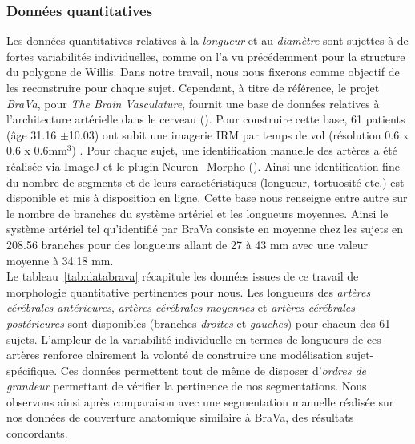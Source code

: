 \subsubsection{Données quantitatives}
Les données quantitatives relatives à la {\em longueur} et au {\em diamètre} sont sujettes à de fortes variabilités individuelles, comme on l'a vu précédemment pour la structure du polygone de Willis. Dans notre travail, nous nous fixerons comme objectif de les reconstruire pour chaque sujet. Cependant, à titre de référence, le projet {\em BraVa}, pour {\em The Brain Vasculature}, fournit une base de données relatives à l'architecture artérielle dans le cerveau (\cite{Wright2013}). Pour construire cette base, 61 patients (âge 31.16 $\pm$10.03) ont subit une imagerie IRM par temps de vol (résolution 0.6 x 0.6 x 0.6mm$^3$) . Pour chaque sujet, une identification manuelle des artères a été réalisée via ImageJ et le plugin Neuron\_Morpho (\cite{neuronmorpho}). Ainsi une identification fine du nombre de segments et de leurs caractéristiques (longueur, tortuosité etc.) est disponible et mis à disposition en ligne. Cette base nous renseigne entre autre sur le nombre de branches du système artériel et les longueurs moyennes. Ainsi le système artériel tel qu'identifié par BraVa consiste en moyenne chez les sujets en 208.56 branches pour des longueurs allant de 27 à 43 mm avec une valeur moyenne à 34.18 mm.\\
Le tableau~\ref{tab:databrava} récapitule les données issues de ce travail de morphologie quantitative pertinentes pour nous. Les longueurs des {\em artères cérébrales antérieures}, {\em artères cérébrales moyennes} et {\em artères cérébrales postérieures} sont disponibles (branches {\em droites} et {\em gauches}) pour chacun des 61 sujets. L'ampleur de la variabilité individuelle en termes de longueurs de ces artères renforce clairement la volonté de construire une modélisation sujet-spécifique. Ces données permettent tout de même de disposer d'{\em ordres de grandeur} permettant de vérifier la pertinence de nos segmentations. Nous observons ainsi après comparaison avec une segmentation manuelle réalisée sur nos données de couverture anatomique similaire à BraVa, des résultats concordants.
